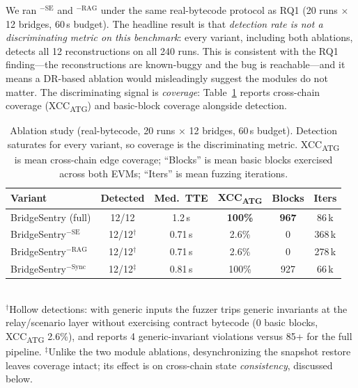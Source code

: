 \documentclass[journal]{IEEEtran}
\begin{document}
We ran $^{-\text{SE}}$ and $^{-\text{RAG}}$ under the same real-bytecode protocol as RQ1 (20 runs $\times$ 12 bridges, 60\,s budget). The headline result is that \emph{detection rate is not a discriminating metric on this benchmark}: every variant, including both ablations, detects all 12 reconstructions on all 240 runs. This is consistent with the RQ1 finding---the reconstructions are known-buggy and the bug is reachable---and it means a DR-based ablation would misleadingly suggest the modules do not matter. The discriminating signal is \emph{coverage}: Table~\ref{tab:ablation} reports cross-chain coverage (XCC\textsubscript{ATG}) and basic-block coverage alongside detection.

\begin{table}[t]
\centering
\caption{Ablation study (real-bytecode, 20 runs $\times$ 12 bridges, 60\,s budget). Detection saturates for every variant, so coverage is the discriminating metric. XCC\textsubscript{ATG} is mean cross-chain edge coverage; ``Blocks'' is mean basic blocks exercised across both EVMs; ``Iters'' is mean fuzzing iterations.}
\label{tab:ablation}
\begin{tabular}{@{}lccccc@{}}
\toprule
Variant & Detected & Med.\ TTE & XCC\textsubscript{ATG} & Blocks & Iters \\
\midrule
BridgeSentry (full) & 12/12 & 1.2\,s & \textbf{100\%} & \textbf{967} & 86\,k \\
BridgeSentry$^{-\text{SE}}$ & 12/12$^{\dagger}$ & 0.71\,s & 2.6\% & 0 & 368\,k \\
BridgeSentry$^{-\text{RAG}}$ & 12/12$^{\dagger}$ & 0.71\,s & 2.6\% & 0 & 278\,k \\
BridgeSentry$^{-\text{Sync}}$ & 12/12$^{\ddagger}$ & 0.81\,s & 100\% & 927 & 66\,k \\
\bottomrule
\end{tabular}
\\[0.3em]
{\footnotesize $^{\dagger}$Hollow detections: with generic inputs the fuzzer trips generic invariants at the relay/scenario layer without exercising contract bytecode (0 basic blocks, XCC\textsubscript{ATG} 2.6\%), and reports 4 generic-invariant violations versus 85+ for the full pipeline. $^{\ddagger}$Unlike the two module ablations, desynchronizing the snapshot restore leaves coverage intact; its effect is on cross-chain state \emph{consistency}, discussed below.}
\end{table}
\end{document}
